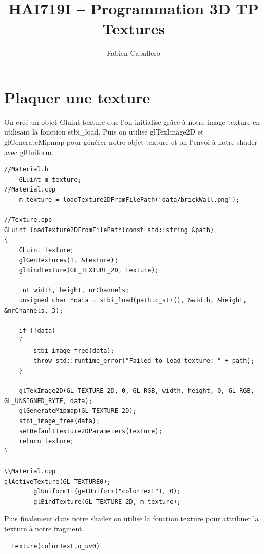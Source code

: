 \documentclass{article}
\title{HAI719I – Programmation 3D TP Textures}
\author{Fabien Caballero }
\begin{document}
\maketitle
\tableofcontents

\newpage
\section{Plaquer une texture}

On créé un objet Gluint texture que l'on initialise grâce à notre image texture en utilisant la fonction stbi\_load. Puis on utilise glTexImage2D et glGenerateMipmap pour générer notre objet texture et on l'envoi à notre shader avec glUniform.

\begin{lstlisting}
//Material.h
	GLuint m_texture;
//Material.cpp
	m_texture = loadTexture2DFromFilePath("data/brickWall.png");

//Texture.cpp
GLuint loadTexture2DFromFilePath(const std::string &path)
{
	GLuint texture;
	glGenTextures(1, &texture);
	glBindTexture(GL_TEXTURE_2D, texture);

	int width, height, nrChannels;
	unsigned char *data = stbi_load(path.c_str(), &width, &height, &nrChannels, 3);

	if (!data)
	{
		stbi_image_free(data);
		throw std::runtime_error("Failed to load texture: " + path);
	}

	glTexImage2D(GL_TEXTURE_2D, 0, GL_RGB, width, height, 0, GL_RGB, GL_UNSIGNED_BYTE, data);
	glGenerateMipmap(GL_TEXTURE_2D);
	stbi_image_free(data);
	setDefaultTexture2DParameters(texture);
	return texture;
}

\\Material.cpp
glActiveTexture(GL_TEXTURE0);
		glUniform1i(getUniform("colorText"), 0);
		glBindTexture(GL_TEXTURE_2D, m_texture);

\end{lstlisting}

Puis finalement dans notre shader on utilise la fonction texture pour attribuer la texture à notre fragment.

\begin{lstlisting}
  texture(colorText,o_uv0)
\end{lstlisting}
\end{document}
